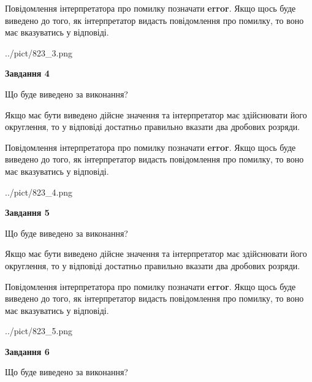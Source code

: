 \documentclass[12pt, ukrainian]{article}
\begin{document}
{\begin {Large}
Повідомлення інтерпретатора про помилку позначати \textbf{error}.
Якщо щось буде виведено до того, як інтерпретатор видасть повідомлення про помилку, 
то воно має вказуватись у відповіді. \par

\begin{center}
	{../pict/823_3.png}
\end{center}
\newpage

{\begin {center}\textbf{Завдання 4}\end {center}}\par
Що буде виведено за виконання? \par

Якщо має бути виведено дійсне значення та інтерпретатор має здійснювати його округлення, 
то у відповіді достатньо правильно вказати два дробових розряди.

Повідомлення інтерпретатора про помилку позначати \textbf{error}.
Якщо щось буде виведено до того, як інтерпретатор видасть повідомлення про помилку, 
то воно має вказуватись у відповіді. \par

\begin{center}
	{../pict/823_4.png}
\end{center}
\newpage

{\begin {center}\textbf{Завдання 5}\end {center}}\par
Що буде виведено за виконання? \par

Якщо має бути виведено дійсне значення та інтерпретатор має здійснювати його округлення, 
то у відповіді достатньо правильно вказати два дробових розряди.

Повідомлення інтерпретатора про помилку позначати \textbf{error}.
Якщо щось буде виведено до того, як інтерпретатор видасть повідомлення про помилку, 
то воно має вказуватись у відповіді. \par

\begin{center}
	{../pict/823_5.png}
\end{center}
\newpage

{\begin {center}\textbf{Завдання 6}\end {center}}\par
Що буде виведено за виконання? \par


\end{Large}}
\end{document}
